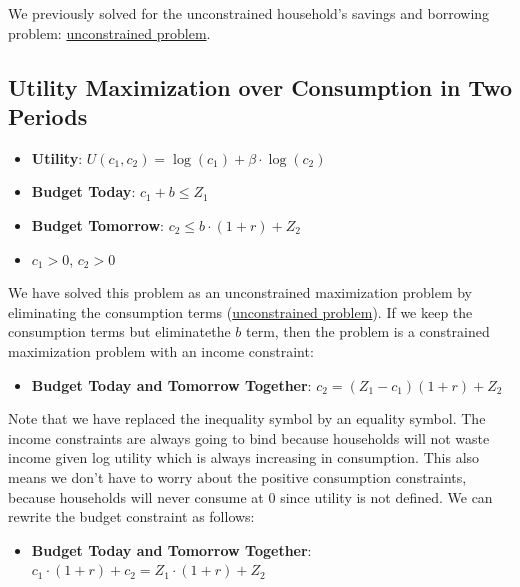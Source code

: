 \documentclass[
]{book}
\providecommand{\tightlist}{%
  \setlength{\itemsep}{0pt}\setlength{\parskip}{0pt}}
\begin{document}
We previously solved for the unconstrained household's savings and
borrowing problem: \href{https://fanwangecon.github.io/Math4Econ/derivative_application/K_save_households.html}{unconstrained
problem}.

\hypertarget{utility-maximization-over-consumption-in-two-periods}{%
\subsection{Utility Maximization over Consumption in Two Periods}\label{utility-maximization-over-consumption-in-two-periods}}

\begin{itemize}
\item
  \textbf{Utility}: \(U(c_1 ,c_2 )=\log (c_1 )+\beta \cdot \log (c_2 )\)
\item
  \textbf{Budget Today}: \(c_1 +b\le Z_1\)
\item
  \textbf{Budget Tomorrow}: \(c_2 \le b\cdot (1+r)+Z_2\)
\item
  \(c_1 >0\), \(c_2 >0\)
\end{itemize}

We have solved this problem as an unconstrained maximization problem by
eliminating the consumption terms (\href{https://fanwangecon.github.io/Math4Econ/derivative_application/K_save_households.html}{unconstrained
problem}).
If we keep the consumption terms but eliminatethe \(b\) term, then the
problem is a constrained maximization problem with an income constraint:

\begin{itemize}
\tightlist
\item
  \textbf{Budget Today and Tomorrow Together}: \(c_2 =(Z_1 -c_1 )(1+r)+Z_2\)
\end{itemize}

Note that we have replaced the inequality symbol by an equality symbol.
The income constraints are always going to bind because households will
not waste income given log utility which is always increasing in
consumption. This also means we don't have to worry about the positive
consumption constraints, because households will never consume at 0
since utility is not defined. We can rewrite the budget constraint as
follows:

\begin{itemize}
\tightlist
\item
  \textbf{Budget Today and Tomorrow Together}:
  \(c_1 \cdot (1+r)+c_2 =Z_1 \cdot (1+r)+Z_2\)
\end{itemize}
\end{document}
